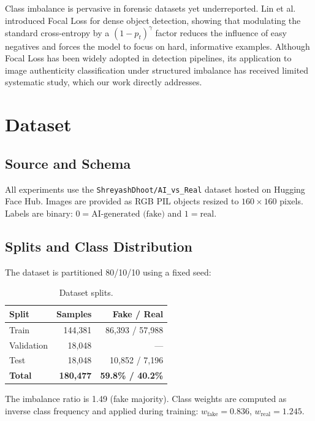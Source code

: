 \documentclass[10pt,twocolumn]{article}
\begin{document}
Class imbalance is pervasive in forensic datasets yet underreported.
Lin et al.~\cite{lin2017focal} introduced Focal Loss for dense object detection,
showing that modulating the standard cross-entropy by a $(1-p_t)^\gamma$ factor
reduces the influence of easy negatives and forces the model to focus on
hard, informative examples. Although Focal Loss has been widely adopted in
detection pipelines, its application to image authenticity classification
under structured imbalance has received limited systematic study, which our
work directly addresses.

\section{Dataset}
\label{sec:dataset}

\subsection{Source and Schema}

All experiments use the \texttt{ShreyashDhoot/AI\_vs\_Real} dataset hosted on
Hugging Face Hub. Images are provided as RGB PIL objects resized to
$160{\times}160$ pixels. Labels are binary:
$0 = \text{AI-generated (fake)}$ and $1 = \text{real}$.

\subsection{Splits and Class Distribution}

The dataset is partitioned 80/10/10 using a fixed seed:

\begin{table}[h]
\centering
\caption{Dataset splits.}
\label{tab:splits}
\begin{tabular}{lrr}
\toprule
\textbf{Split} & \textbf{Samples} & \textbf{Fake / Real} \\
\midrule
Train      & 144,381 & 86,393 / 57,988 \\
Validation &  18,048 & --- \\
Test       &  18,048 & 10,852 / 7,196 \\
\midrule
\textbf{Total} & \textbf{180,477} & \textbf{59.8\% / 40.2\%} \\
\bottomrule
\end{tabular}
\end{table}

The imbalance ratio is 1.49 (fake majority). Class weights are computed as
inverse class frequency and applied during training:
$w_{\text{fake}}{=}0.836$, $w_{\text{real}}{=}1.245$.
\end{document}
